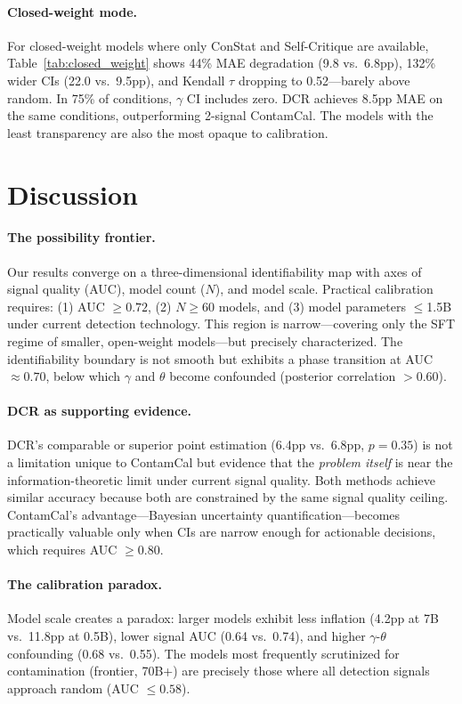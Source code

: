 \documentclass[letterpaper,11pt]{article}
\begin{document}
\paragraph{Closed-weight mode.}
For closed-weight models where only ConStat and Self-Critique are available, Table~\ref{tab:closed_weight} shows 44\% MAE degradation (9.8 vs.\ 6.8pp), 132\% wider CIs (22.0 vs.\ 9.5pp), and Kendall $\tau$ dropping to 0.52---barely above random.
In 75\% of conditions, $\gamma$ CI includes zero.
DCR achieves 8.5pp MAE on the same conditions, outperforming 2-signal ContamCal.
The models with the least transparency are also the most opaque to calibration.

\section{Discussion}

\paragraph{The possibility frontier.}
Our results converge on a three-dimensional identifiability map with axes of signal quality (AUC), model count ($N$), and model scale.
Practical calibration requires: (1) AUC $\geq 0.72$, (2) $N \geq 60$ models, and (3) model parameters $\leq$1.5B under current detection technology.
This region is narrow---covering only the SFT regime of smaller, open-weight models---but precisely characterized.
The identifiability boundary is not smooth but exhibits a phase transition at AUC $\approx 0.70$, below which $\gamma$ and $\theta$ become confounded (posterior correlation $> 0.60$).

\paragraph{DCR as supporting evidence.}
DCR's comparable or superior point estimation (6.4pp vs.\ 6.8pp, $p = 0.35$) is not a limitation unique to ContamCal but evidence that the \emph{problem itself} is near the information-theoretic limit under current signal quality.
Both methods achieve similar accuracy because both are constrained by the same signal quality ceiling.
ContamCal's advantage---Bayesian uncertainty quantification---becomes practically valuable only when CIs are narrow enough for actionable decisions, which requires AUC $\geq 0.80$.

\paragraph{The calibration paradox.}
Model scale creates a paradox: larger models exhibit less inflation (4.2pp at 7B vs.\ 11.8pp at 0.5B), lower signal AUC (0.64 vs.\ 0.74), and higher $\gamma$-$\theta$ confounding (0.68 vs.\ 0.55).
The models most frequently scrutinized for contamination (frontier, 70B+) are precisely those where all detection signals approach random (AUC $\leq 0.58$).
\end{document}

